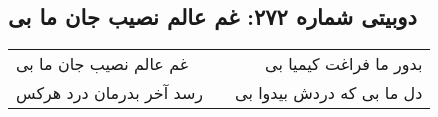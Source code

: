 \begin{center}
\section*{دوبیتی شماره ۲۷۲: غم عالم نصیب جان ما بی}
\label{sec:272}
\begin{longtable}{l p{0.5cm} r}
غم عالم نصیب جان ما بی
&&
بدور ما فراغت کیمیا بی
\\
رسد آخر بدرمان درد هرکس
&&
دل ما بی که دردش بیدوا بی
\\
\end{longtable}
\end{center}

